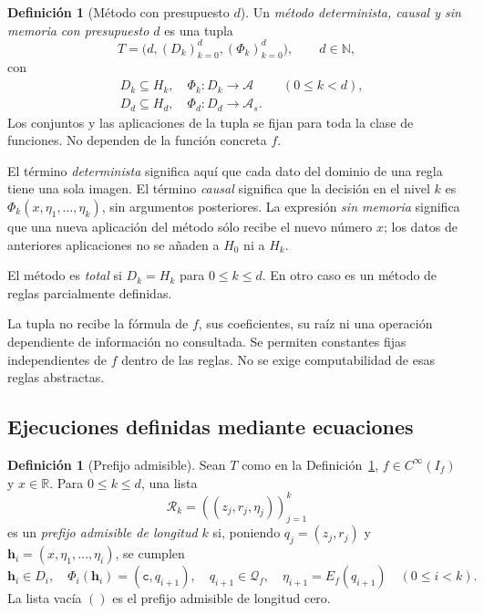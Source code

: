 \documentclass[11pt,a4paper]{article}
\numberwithin{equation}{section}
\theoremstyle{definition}
\newtheorem{definition}[theorem]{Definición}
\theoremstyle{remark}
\newcommand{\R}{\mathbb R}
\newcommand{\N}{\mathbb N}
\newcommand{\QQ}{\mathcal Q}
\newcommand{\Rec}{\mathcal R}
\newcommand{\hc}{\mathbf h}
\newcommand{\ct}{\mathtt c}
\begin{document}
\begin{definition}[Método con presupuesto $d$]\label{def:method}
Un \emph{método determinista, causal y sin memoria con presupuesto $d$} es una tupla
\[
T=\bigl(d,(D_k)_{k=0}^{d},(\Phi_k)_{k=0}^{d}\bigr),\qquad d\in\N,
\]
con
\begin{align*}
&D_k\subseteq H_k,\quad \Phi_k:D_k\to\mathcal A &&(0\le k<d),\\
&D_d\subseteq H_d,\quad \Phi_d:D_d\to\mathcal A_s.&
\end{align*}
Los conjuntos y las aplicaciones de la tupla se fijan para toda la clase de funciones. No dependen de la función concreta $f$.

El término \emph{determinista} significa aquí que cada dato del dominio de una regla tiene una sola imagen. El término \emph{causal} significa que la decisión en el nivel $k$ es $\Phi_k(x,\eta_1,\ldots,\eta_k)$, sin argumentos posteriores. La expresión \emph{sin memoria} significa que una nueva aplicación del método sólo recibe el nuevo número $x$; los datos de anteriores aplicaciones no se añaden a $H_0$ ni a $H_k$.

El método es \emph{total} si $D_k=H_k$ para $0\le k\le d$. En otro caso es un método de reglas parcialmente definidas.
\end{definition}

La tupla no recibe la fórmula de $f$, sus coeficientes, su raíz ni una operación dependiente de información no consultada. Se permiten constantes fijas independientes de $f$ dentro de las reglas. No se exige computabilidad de esas reglas abstractas.

\subsection{Ejecuciones definidas mediante ecuaciones}
\begin{definition}[Prefijo admisible]\label{def:prefix}
Sean $T$ como en la Definición~\ref{def:method}, $f\in C^\infty(I_f)$ y $x\in\R$. Para $0\le k\le d$, una lista
\[
\Rec_k=((z_j,r_j,\eta_j))_{j=1}^{k}
\]
es un \emph{prefijo admisible de longitud $k$} si, poniendo $q_j=(z_j,r_j)$ y $\hc_i=(x,\eta_1,\ldots,\eta_i)$, se cumplen
\begin{equation}\label{eq:prefix}
\hc_i\in D_i,\quad
\Phi_i(\hc_i)=(\ct,q_{i+1}),\quad
q_{i+1}\in\QQ_f,\quad
\eta_{i+1}=E_f(q_{i+1})\quad(0\le i<k).
\end{equation}
La lista vacía $()$ es el prefijo admisible de longitud cero.
\end{definition}
\end{document}
